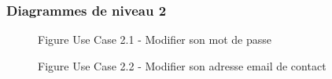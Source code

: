 \documentclass[a4paper, 11pt]{article}
\begin{document}
        \subsubsection{ Diagrammes de niveau 2}
	\begin{figure}[h]
        \caption{Figure Use Case 2.1 - Modifier son mot de passe}
        \label{fig-diag-use-case-2-2-1}
        \end{figure}
	\begin{figure}[h]
        \caption{Figure Use Case 2.2 - Modifier son adresse email de contact}
        \label{fig-diag-use-case-2-2-2}
        \end{figure}
	\clearpage
\end{document}
